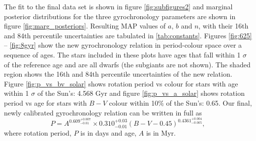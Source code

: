 \documentclass[10pt,preprint]{aastex}
\newcommand{\gyroa}{0.310}
\newcommand{\aerrp}{0.03}
\newcommand{\aerrm}{0.01}
\newcommand{\gyron}{0.609}
\newcommand{\nerrp}{0.007}
\newcommand{\nerrm}{0.01}
\newcommand{\gyrob}{0.4361}
\newcommand{\berrp}{0.004}
\newcommand{\berrm}{0.005}
\begin{document}
The fit to the final data set is shown in figure \ref{fig:subfigures2} and marginal posterior distributions for the three gyrochronology parameters are shown in figure \ref{fig:marg_posteriors}.
Resulting MAP values of $a$, $b$ and $n$, with their 16th and 84th percentile uncertainties are tabulated in \ref{tab:constants}.
Figures \ref{fig:625} -- \ref{fig:8gyr} show the new gyrochronology relation in period-colour space over a sequence of ages.
The stars included in these plots have ages that fall within 1 $\sigma$ of the reference age and are all dwarfs (the subgiants are not shown).
The shaded region shows the 16th and 84th percentile uncertainties of the new relation.
Figure \ref{fig:p_vs_bv_solar} shows rotation period vs colour for stars with age within 1 $\sigma$ of the Sun's: 4.568 Gyr and figure \ref{fig:p_vs_a_solar} shows rotation period vs age for stars with $B-V$ colour within 10\% of the Sun's: 0.65.
Our final, newly calibrated gyrochronology relation can be written in full as
\begin{equation}
	P = A^{\gyron^{+\nerrp}_{-\nerrm}} \times \gyroa^{+\aerrp}_{-\aerrm}(B-V-0.45)^{\gyrob^{+\berrp}_{-\berrm}},
\label{eq:Barnes2007_2}
\end{equation}
where rotation period, $P$ is in days and age, $A$ is in Myr.
\end{document}
